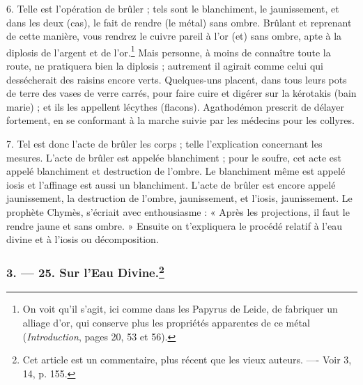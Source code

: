\documentclass[a4paper, 11pt, oneside, polutonikogreek, french]{article}
\begin{document}
6. Telle est l'opération de brûler ; tels sont le blanchiment, le jaunissement, et dans les deux (cas), le fait de rendre (le métal) sans ombre. Brûlant et reprenant de cette manière, vous rendrez le cuivre pareil à l'or (et) sans ombre, apte à la diplosis de l'argent et de l'or.\footnote{On voit qu'il s'agit, ici comme dans les Papyrus de Leide, de fabriquer un alliage d'or, qui conserve plus les propriétés apparentes de ce métal (\emph{Introduction}, pages 20, 53 et 56).} Mais personne, à moins de connaître toute la route, ne pratiquera bien la diplosis ; autrement il agirait comme celui qui dessécherait des raisins encore verts. Quelques-uns placent, dans tous leurs pots de terre des vases de verre carrés, pour faire cuire et digérer sur la kérotakis (bain marie) ; et ils les appellent lécythes (flacons). Agathodémon prescrit de délayer fortement, en se conformant à la marche suivie par les médecins pour les collyres.

7. Tel est donc l'acte de brûler les corps ; telle l'explication concernant les mesures. L'acte de brûler est appelée blanchiment ; pour le soufre, cet acte est appelé blanchiment et destruction de l'ombre. Le blanchiment même est appelé iosis et l'affinage est aussi un blanchiment. L'acte de brûler est encore appelé jaunissement, la destruction de l'ombre, jaunissement, et l'iosis, jaunissement. Le prophète Chymès, s'écriait avec enthousiasme : « Après les projections, il faut le rendre jaune et sans ombre. » Ensuite on t'expliquera le procédé relatif à l'eau divine et à l'iosis ou décomposition.

\bigskip
\centerline{\EightStarTaper}
\centerline{\EightStarTaper\EightStarTaper}
\bigskip

\subsubsection[3. --- 25. Sur l'Eau Divine.]{3. --- 25. Sur l'Eau Divine.\footnote{Cet article est un commentaire, plus récent que les vieux auteurs. ---- Voir 3, 14, p. 155.}}
\end{document}
